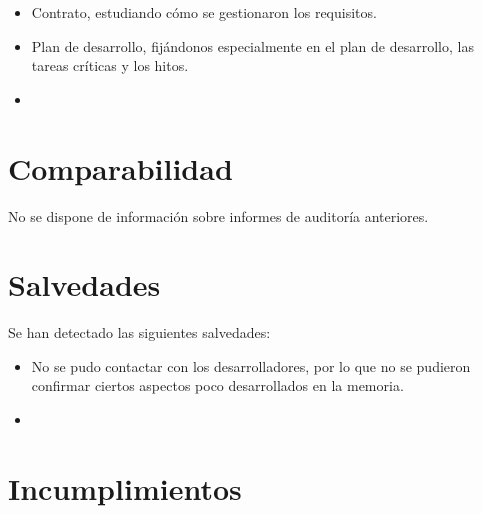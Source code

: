 \begin{center}
\begin{itemize}
\item
Contrato, estudiando c\'omo se gestionaron los requisitos.

\item
Plan de desarrollo, fij\'andonos especialmente en el plan de desarrollo,
las tareas cr\'iticas y los hitos.

\item
{}
\end{itemize}

\section*{Comparabilidad}

No se dispone de informaci\'on sobre informes de auditor\'ia anteriores.


\section*{Salvedades}

Se han detectado las siguientes salvedades:
\begin{itemize}
\item
No se pudo contactar con los desarrolladores, por lo que no se pudieron
confirmar ciertos aspectos poco desarrollados en la memoria.

\item
{}
\end{itemize}

\section*{Incumplimientos}


\end{center}
